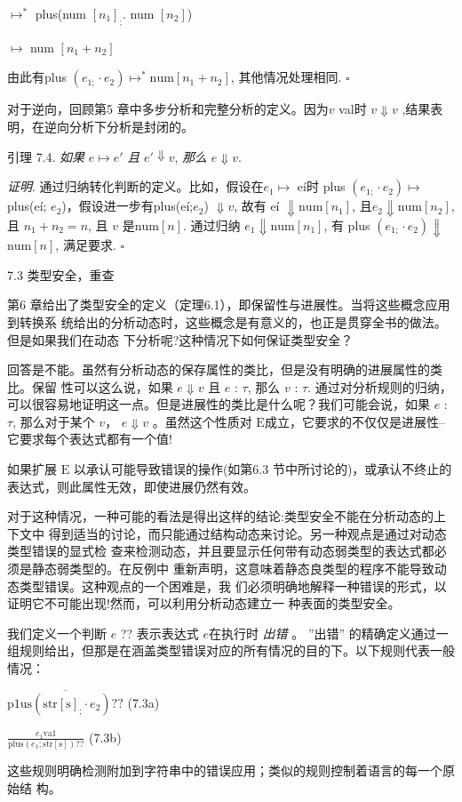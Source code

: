 $\mapsto^{*}$ plus(num $[n_{1}]_{;}$. num $[n_{2}]$)

$\mapsto$ num $[n_{1}+n_{2}]$

由此有plus $(e_{1;}\cdot e_{2}) \mapsto^{*}\mathrm{n}\mathrm{u}\mathrm{m}[n_{1}+n_{2}]$, 其他情况处理相同. $\square $

对于逆向，回顾第5 章中多步分析和完整分析的定义。因为$v$ val时 $v\Downarrow v$ ,结果表明，在逆向分析下分析是封闭的。

引理 7.4. {\it 如果} $e\mapsto e'$ {\it 且} $e'\Downarrow v$, {\it 那么} $e\Downarrow v.$

{\it 证明}. 通过归纳转化判断的定义。比如，假设在$e_{1} \mapsto$ e\'{i}时 plus $(e_{1;}\cdot e_{2}) \mapsto$plus(e\'{i}; $e_{2}$)，假设进一步有plus(e\'{i};$e_{2}$) $\Downarrow v$, 故有 e\'{i} $\Downarrow \mathrm{n}\mathrm{u}\mathrm{m}[n_{1}]$, 且$e_{2}\Downarrow \mathrm{n}\mathrm{u}\mathrm{m}[n_{2}]$, 且 $n_{1}+n_{2}=n$, 且 $v$ 是$\mathrm{n}\mathrm{u}\mathrm{m}[n]$. 通过归纳 $e_{1}\Downarrow \mathrm{n}\mathrm{u}\mathrm{m}[n_{1}]$, 有 plus $(e_{1;}\cdot e_{2})\Downarrow$
$\mathrm{n}\mathrm{u}\mathrm{m}[n]$, 满足要求. $\square $

7.3 类型安全，重查

第6 章给出了类型安全的定义（定理6.1），即保留性与进展性。当将这些概念应用到转换系
统给出的分析动态时，这些概念是有意义的，也正是贯穿全书的做法。但是如果我们在动态
下分析呢?这种情况下如何保证类型安全？

回答是不能。虽然有分析动态的保存属性的类比，但是没有明确的进展属性的类比。保留
性可以这么说，如果 $e \Downarrow v$ 且 $e$ : $\tau$, 那么 $v$ : $\tau$. 通过对分析规则的归纳，可以很容易地证明这一点。但是进展性的类比是什么呢？我们可能会说，如果 $e$ : $\tau$, 那么对于某个 $v$， $e\Downarrow v$ 。虽然这个性质对 $\mathrm{E}$成立，它要求的不仅仅是进展性--它要求每个表达式都有一个值!

如果扩展 $\mathrm{E}$ 以承认可能导致错误的操作(如第6.3 节中所讨论的)，或承认不终止的表达式，则此属性无效，即使进展仍然有效。

对于这种情况，一种可能的看法是得出这样的结论:类型安全不能在分析动态的上下文中
得到适当的讨论，而只能通过结构动态来讨论。另一种观点是通过对动态类型错误的显式检
查来检测动态，并且要显示任何带有动态弱类型的表达式都必须是静态弱类型的。在反例中
重新声明，这意味着静态良类型的程序不能导致动态类型错误。这种观点的一个困难是，我
们必须明确地解释一种错误的形式，以证明它不可能出现!然而，可以利用分析动态建立一
种表面的类型安全。

我们定义一个判断 $e$ ?? 表示表达式 $e$在执行时 {\it 出错} 。 ''出错'' 的精确定义通过一组规则给出，但那是在涵盖类型错误对应的所有情况的目的下。以下规则代表一般情况：
\begin{center}
$\overline{\mathrm{p}1\mathrm{u}\mathrm{s}(\mathrm{s}\mathrm{t}\mathrm{r}[\mathrm{s}]_{;}\cdot e_{2})??}$   (7.3a)

$\displaystyle \frac{e_{1}\mathrm{v}\mathrm{a}1}{\mathrm{p}\mathrm{l}\mathrm{u}\mathrm{s}(e_{1};\mathrm{s}\mathrm{t}\mathrm{r}[\mathrm{s}])??}$   (7.3b)
\end{center}
这些规则明确检测附加到字符串中的错误应用；类似的规则控制着语言的每一个原始结
构。

